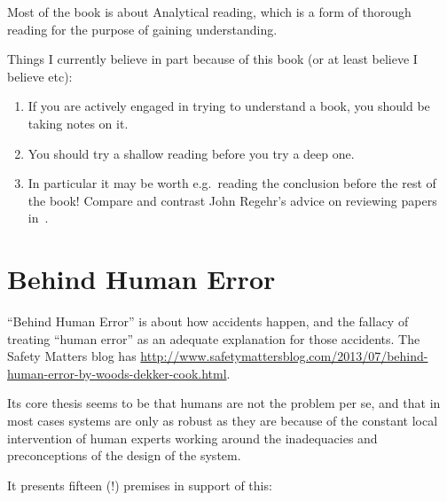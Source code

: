 \documentclass[a4paper]{book}
\begin{document}
Most of the book is about Analytical reading,
which is a form of thorough reading for the purpose of gaining understanding.

Things I currently believe in part because of this book (or at least believe I believe etc):

\begin{enumerate}
\item If you are actively engaged in trying to understand a book, you should be taking notes on it.
\item You should try a shallow reading before you try a deep one.
\item In particular it may be worth e.g.\ reading the conclusion before the rest of the book!
Compare and contrast John Regehr's advice on reviewing papers in~\cite{ReviewingPapers}.
\end{enumerate}

\section{Behind Human Error}

``Behind Human Error'' is about how accidents happen,
and the fallacy of treating ``human error'' as an adequate explanation for those accidents.
The Safety Matters blog has \href{a good review of this book}{http://www.safetymattersblog.com/2013/07/behind-human-error-by-woods-dekker-cook.html}.

Its core thesis seems to be that humans are not the problem per se,
and that in most cases systems are only as robust as they are because of the constant local intervention of human experts working around the inadequacies and preconceptions of the design of the system.

It presents fifteen (!) premises in support of this:
\end{document}
